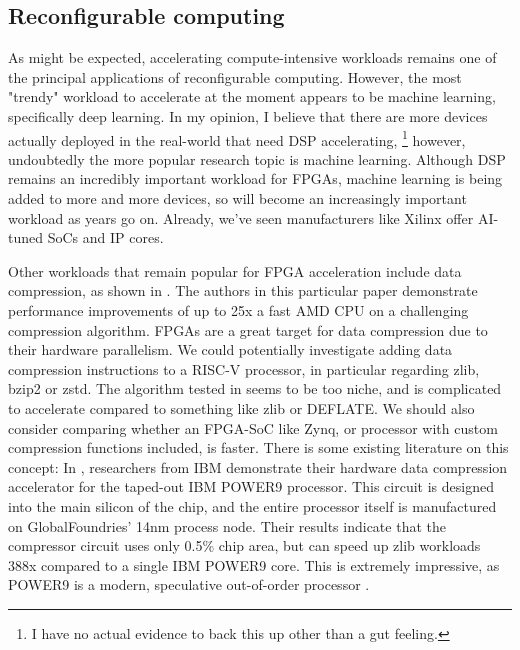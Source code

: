 \documentclass[12pt]{article}
\begin{document}
\subsection{Reconfigurable computing}
As might be expected, accelerating compute-intensive workloads remains one of the principal applications of
reconfigurable computing. However, the most "trendy" workload to accelerate at the moment appears to be
machine learning, specifically deep learning. In my opinion, I believe that there are more devices actually
deployed in the real-world that need DSP accelerating,
\footnote{I have no actual evidence to back this up other than a gut feeling.}
however, undoubtedly the more popular research topic
is machine learning. Although DSP remains an incredibly important workload for FPGAs, machine
learning is being added to more and more devices, so will become an increasingly important workload as
years go on. Already, we've seen manufacturers like Xilinx offer AI-tuned SoCs and IP cores.

Other workloads that remain popular for FPGA acceleration include data compression, as shown in
\cite{Dongdong2022}. The authors in this particular paper demonstrate performance improvements of up to 25x a
fast AMD CPU on a challenging compression algorithm. FPGAs are a great target for data compression due to
their hardware parallelism. We could potentially investigate adding data compression instructions to a RISC-V
processor, in particular regarding zlib, bzip2 or zstd. The algorithm tested in \cite{Dongdong2022} seems to
be too niche, and is complicated to accelerate compared to something like zlib or DEFLATE. We should also
consider comparing whether an FPGA-SoC like Zynq, or processor with custom compression functions included, is
faster. There is some existing literature on this concept: In \cite{Abali2020}, researchers from IBM
demonstrate their hardware data compression accelerator for the taped-out IBM POWER9 processor. This circuit
is designed into the main silicon of the chip, and the entire processor itself is manufactured on
GlobalFoundries' 14nm process node. Their results indicate that the compressor circuit uses only 0.5\% chip 
area, but can speed up zlib workloads 388x compared to a single IBM POWER9 core. This is extremely impressive, 
as POWER9 is a modern, speculative out-of-order processor \cite{Sadasivam2017IBMPP}. 
\end{document}
